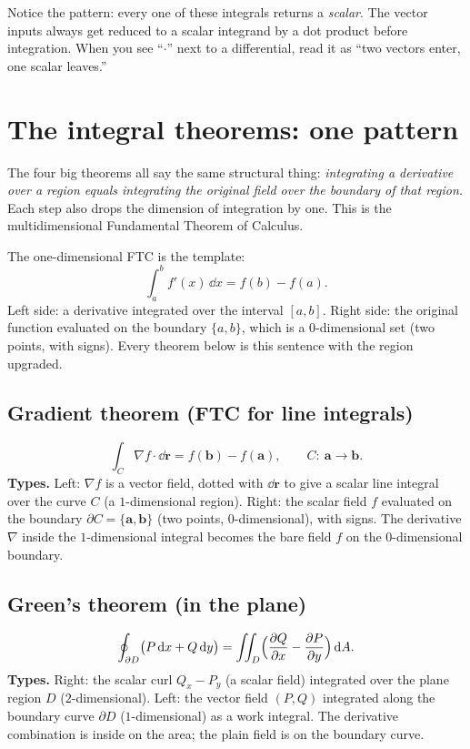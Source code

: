 \documentclass{essay}
\begin{document}
Notice the pattern: every one of these integrals returns a \emph{scalar}. The vector
inputs always get reduced to a scalar integrand by a dot product before integration.
When you see ``\(\cdot\)'' next to a differential, read it as ``two vectors enter, one
scalar leaves.''

\section{The integral theorems: one pattern}

The four big theorems all say the same structural thing: \emph{integrating a
  derivative over a region equals integrating the original field over the boundary of
that region.} Each step also drops the dimension of integration by one. This is the
multidimensional Fundamental Theorem of Calculus.

The one-dimensional FTC is the template:
\[ \int_{a}^{b} f'(x)\,\dd x = f(b) - f(a). \]
Left side: a derivative integrated over the interval \([a,b]\). Right side: the
original function evaluated on the boundary \(\{a,b\}\), which is a \(0\)-dimensional set
(two points, with signs). Every theorem below is this sentence with the region
upgraded.

\subsection{Gradient theorem (FTC for line integrals)}

\[ \int_{C} \nabla f\cdot\dd\mathbf{r} = f(\mathbf{b}) - f(\mathbf{a}), \qquad C:\ \mathbf{a}\to\mathbf{b}. \]
\textbf{Types.} Left: \(\nabla f\) is a vector field, dotted with \(\dd\mathbf{r}\) to
give a scalar line integral over the curve \(C\) (a \(1\)-dimensional region). Right: the
scalar field \(f\) evaluated on the boundary \(\partial C=\{\mathbf{a},\mathbf{b}\}\)
(two points, \(0\)-dimensional), with signs. The derivative \(\nabla\) inside the
\(1\)-dimensional integral becomes the bare field \(f\) on the \(0\)-dimensional boundary.

\subsection{Green's theorem (in the plane)}

\[ \oint_{\partial D} \bigl(P\,\mathrm{d} x + Q\,\mathrm{d} y\bigr) = \iint_{D} \Bigl(\frac{\partial Q}{\partial x} - \frac{\partial P}{\partial y}\Bigr)\,\mathrm{d} A . \]
\textbf{Types.} Right: the scalar curl \(Q_{x}-P_{y}\) (a scalar field) integrated over the
plane region \(D\) (\(2\)-dimensional). Left: the vector field \((P,Q)\) integrated along
the boundary curve \(\partial D\) (\(1\)-dimensional) as a work integral. The derivative
combination is inside on the area; the plain field is on the boundary curve.
\end{document}
